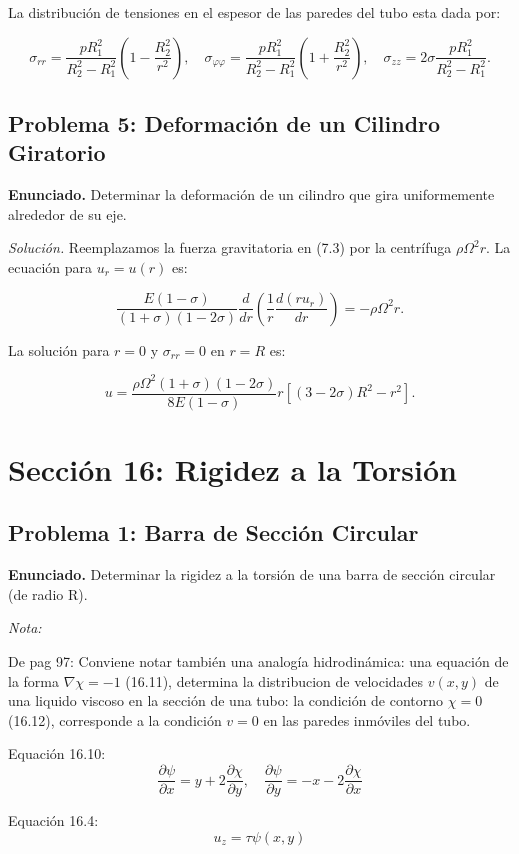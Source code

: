 \documentclass{article}
\begin{document}
La distribución de tensiones en el espesor de las paredes del tubo esta dada por:

$$
\sigma_{rr} = \frac{pR_1^2}{R_2^2 - R_1^2} \left(1 - \frac{R_2^2}{r^2}\right), \quad \sigma_{\varphi\varphi} = \frac{pR_1^2}{R_2^2 - R_1^2} \left(1 + \frac{R_2^2}{r^2}\right), \quad \sigma_{zz} = 2\sigma \frac{pR_1^2}{R_2^2 - R_1^2}.
$$

\subsection*{Problema 5: Deformación de un Cilindro Giratorio}
\textbf{Enunciado.} Determinar la deformación de un cilindro que gira uniformemente alrededor de su eje.

\textit{Solución.} Reemplazamos la fuerza gravitatoria en (7.3) por la centrífuga $\rho \Omega^2 r$. La ecuación para $u_r = u(r)$ es:

$$
\frac{E(1-\sigma)}{(1+\sigma)(1-2\sigma)} \frac{d}{dr} \left( \frac{1}{r} \frac{d(ru_r)}{dr} \right) = -\rho \Omega^2 r.
$$

La solución para $r = 0$ y $\sigma_{rr} = 0$ en $r = R$ es:

$$
u = \frac{\rho \Omega^2 (1+\sigma)(1-2\sigma)}{8E(1-\sigma)} r [(3-2\sigma)R^2 - r^2].
$$

\section*{Sección 16: Rigidez a la Torsión}

\subsection*{Problema 1: Barra de Sección Circular}
\textbf{Enunciado.} Determinar la rigidez a la torsión de una barra de sección circular (de radio R).

\textit{Nota:}

De pag 97: Conviene notar también una analogía hidrodinámica: una equación de la forma $\nabla \chi = -1$ (16.11), determina la distribucion de velocidades $v(x,y)$ de una liquido viscoso en la sección de una tubo: la condición de contorno $\chi = 0$ (16.12), corresponde a la condición $v=0$ en las paredes inmóviles del tubo.

Equación 16.10: $$ \frac{\partial \psi}{\partial x} = y + 2\frac{\partial \chi}{\partial y}, \quad \frac{\partial \psi}{\partial y} = -x -2\frac{\partial \chi}{\partial x} $$

Equación 16.4: $$ u_z = \tau \psi(x,y) $$
\end{document}
